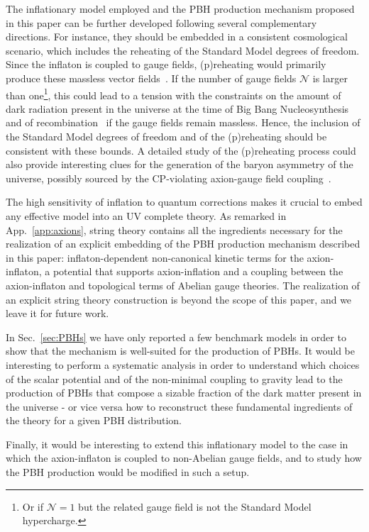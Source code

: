 The inflationary model employed and the PBH production mechanism proposed in this paper can be further developed following several complementary directions. For instance, they should be embedded in a consistent cosmological scenario, which includes the reheating of the Standard Model degrees of freedom. Since the inflaton is coupled to gauge fields, (p)reheating would primarily produce these massless vector fields~\cite{Adshead:2015pva}. If the number of gauge fields $\mathcal{N}$ is larger than one\footnote{Or if $\mathcal{N}=1$ but the related gauge field is not the Standard Model hypercharge.}, this could lead to a tension with the constraints on the amount of dark radiation present in the universe at the time of Big Bang Nucleosynthesis and of recombination~\cite{Ade:2015xua} if the gauge fields remain massless. Hence, the inclusion of the Standard Model degrees of freedom and of the (p)reheating should be consistent with these bounds. A detailed study of the (p)reheating process could also provide interesting clues for the generation of the baryon asymmetry of the universe, possibly sourced by the CP-violating axion-gauge field coupling~\cite{Kusenko:2014uta,Anber:2015yca,Adshead:2015jza}.

The high sensitivity of inflation to quantum corrections makes it crucial to embed any effective model into an UV complete theory. As remarked in App.~\ref{app:axions}, string theory contains all the ingredients necessary for the realization of an explicit embedding of the PBH production mechanism described in this paper: inflaton-dependent non-canonical kinetic terms for the axion-inflaton, a potential that supports axion-inflation and a coupling between the axion-inflaton and topological terms of Abelian gauge theories. The realization of an explicit string theory construction is beyond the scope of this paper, and we leave it for future work.

In Sec.~\ref{sec:PBHs} we have only reported a few benchmark models in order to show that the mechanism is well-suited for the production of PBHs. It would be interesting to perform a systematic analysis in order to understand which choices of the scalar potential and of the non-minimal coupling to gravity lead to the production of PBHs that compose a sizable fraction of the dark matter present in the universe - or vice versa how to reconstruct these fundamental ingredients of the theory for a given PBH distribution.

Finally, it would be interesting to extend this inflationary model to the case in which the axion-inflaton is coupled to non-Abelian gauge fields, and to study how the PBH production would be modified in such a setup.